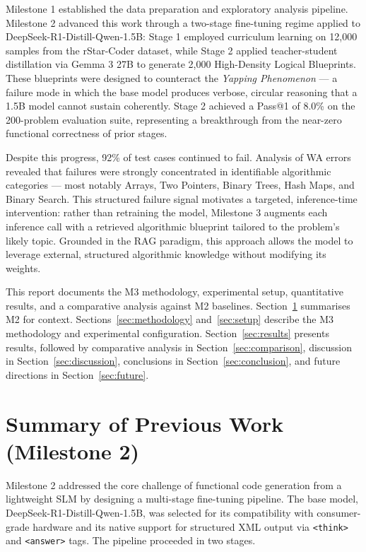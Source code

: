 \documentclass[12pt,a4paper]{article}
\begin{document}
Milestone 1 established the data preparation and exploratory analysis pipeline. Milestone 2 advanced this work through a two-stage fine-tuning regime applied to DeepSeek-R1-Distill-Qwen-1.5B: Stage 1 employed curriculum learning on 12,000 samples from the rStar-Coder dataset, while Stage 2 applied teacher-student distillation via Gemma 3 27B to generate 2,000 High-Density Logical Blueprints. These blueprints were designed to counteract the \textit{Yapping Phenomenon} --- a failure mode in which the base model produces verbose, circular reasoning that a 1.5B model cannot sustain coherently. Stage 2 achieved a Pass@1 of 8.0\% on the 200-problem evaluation suite, representing a breakthrough from the near-zero functional correctness of prior stages.

Despite this progress, 92\% of test cases continued to fail. Analysis of WA errors revealed that failures were strongly concentrated in identifiable algorithmic categories --- most notably Arrays, Two Pointers, Binary Trees, Hash Maps, and Binary Search. This structured failure signal motivates a targeted, inference-time intervention: rather than retraining the model, Milestone 3 augments each inference call with a retrieved algorithmic blueprint tailored to the problem's likely topic. Grounded in the RAG paradigm, this approach allows the model to leverage external, structured algorithmic knowledge without modifying its weights.

This report documents the M3 methodology, experimental setup, quantitative results, and a comparative analysis against M2 baselines. Section~\ref{sec:m2} summarises M2 for context. Sections~\ref{sec:methodology} and~\ref{sec:setup} describe the M3 methodology and experimental configuration. Section~\ref{sec:results} presents results, followed by comparative analysis in Section~\ref{sec:comparison}, discussion in Section~\ref{sec:discussion}, conclusions in Section~\ref{sec:conclusion}, and future directions in Section~\ref{sec:future}.

\section{Summary of Previous Work (Milestone 2)}
\label{sec:m2}

Milestone 2 addressed the core challenge of functional code generation from a lightweight SLM by designing a multi-stage fine-tuning pipeline. The base model, DeepSeek-R1-Distill-Qwen-1.5B, was selected for its compatibility with consumer-grade hardware and its native support for structured XML output via \texttt{<think>} and \texttt{<answer>} tags. The pipeline proceeded in two stages.
\end{document}
